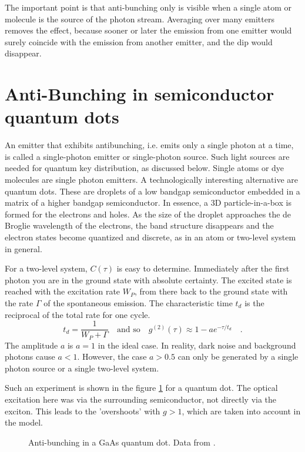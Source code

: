 The important point is that anti-bunching only is visible when a single atom or molecule is the source of the photon stream. Averaging over many emitters removes the effect, because sooner or later the emission from one emitter would surely coincide with the emission from another emitter, and the dip would disappear.

\section{Anti-Bunching in semiconductor quantum dots}

An emitter that exhibits antibunching, i.e. emits only a single photon at a time, is called a single-photon emitter or single-photon source. Such light sources are needed for quantum key distribution, as discussed below. Single atoms or dye molecules are single photon emitters. A technologically interesting alternative are quantum dots. These are droplets of a low bandgap semiconductor embedded in a matrix of a higher bandgap semiconductor. In essence, a 3D particle-in-a-box is formed for the electrons and holes. As the size of the droplet approaches the de Broglie wavelength of the electrons, the band structure disappears and the electron states become quantized and discrete, as in an atom or two-level system in general.


For a two-level system, $C(\tau)$ is easy to determine. Immediately after the first photon you are in the ground state with absolute certainty. The excited state is reached with the excitation rate $W_P$, from there back to the ground state with the rate $\Gamma$ of the spontaneous emission. The characteristic time $t_d$ is the reciprocal of the total rate for one cycle.
\begin{equation}
    t_d = \frac{1}{W_P + \Gamma} \quad \text{and so} \quad g^{(2)}(\tau) \approx 1 - a e^{- \tau / t_d} \quad .
\end{equation}
The amplitude $a$ is $a=1$ in the ideal case. In reality, dark noise and background photons cause $a < 1$. However, the case $a> 0.5$ can only be generated by a single photon source or a single two-level system.  

Such an experiment is shown in the figure  \ref{fig:8_gaas_antibunching} for a  quantum dot. The optical excitation here was via the surrounding semiconductor, not directly via the exciton. This leads to the 'overshoots' with $g>1$, which are taken into account in the model.

\begin{figure}
    \caption{Anti-bunching in a GaAs quantum dot. Data from \cite{Wu2017a}. \label{fig:8_gaas_antibunching}}
\end{figure}




